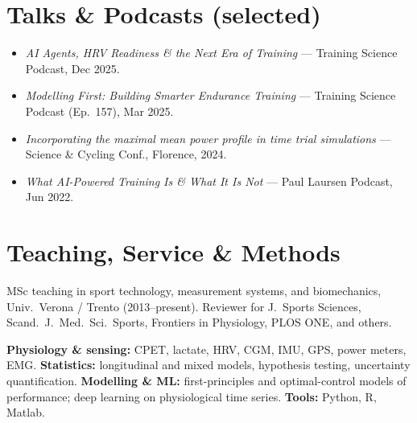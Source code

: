 \documentclass[10pt,a4paper]{article}
\begin{document}
\section{Talks \& Podcasts (selected)}

\begin{itemize}
  \item \textit{AI Agents, HRV Readiness \& the Next Era of Training} — Training Science Podcast, Dec 2025.
  \item \textit{Modelling First: Building Smarter Endurance Training} — Training Science Podcast (Ep.\ 157), Mar 2025.
  \item \textit{Incorporating the maximal mean power profile in time trial simulations} — Science \& Cycling Conf., Florence, 2024.
  \item \textit{What AI-Powered Training Is \& What It Is Not} — Paul Laursen Podcast, Jun 2022.
\end{itemize}

\section{Teaching, Service \& Methods}

{\small MSc teaching in sport technology, measurement systems, and biomechanics, Univ.\ Verona / Trento (2013--present). Reviewer for J.\ Sports Sciences, Scand.\ J.\ Med.\ Sci.\ Sports, Frontiers in Physiology, PLOS ONE, and others.}

{\small \textbf{Physiology \& sensing:} CPET, lactate, HRV, CGM, IMU, GPS, power meters, EMG. \textbf{Statistics:} longitudinal and mixed models, hypothesis testing, uncertainty quantification. \textbf{Modelling \& ML:} first-principles and optimal-control models of performance; deep learning on physiological time series. \textbf{Tools:} Python, R, Matlab.}
\end{document}
